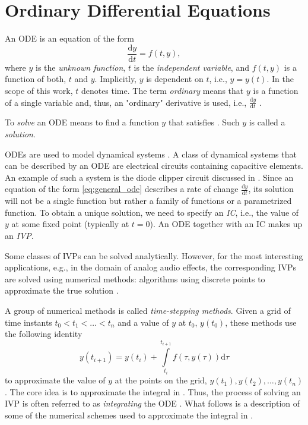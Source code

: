 \section{Ordinary Differential Equations}
\label{section:ode}

An \acf{ODE} is an equation of the form
\begin{equation}
  \frac{\mathrm{d} y}{\mathrm{d} t} = f(t, y),
  \label{eq:general_ode}
\end{equation}
where $y$ is the \emph{unknown function}, $t$ is the \emph{independent variable}, and $f(t, y)$ is a function of both, $t$ and $y$. Implicitly, $y$ is dependent on $t$, i.e., $y = y(t)$. In the scope of this work, $t$ denotes time. The term \emph{ordinary} means that $y$ is a function of a single variable and, thus, an "ordinary" derivative is used, i.e., $\frac{\mathrm{d} y}{\mathrm{d} t}$ \cite{Gockenbach2011}.

To \emph{solve} an \ac{ODE} means to find a function $y$ that satisfies . Such $y$ is called a \emph{solution}.

\acp{ODE} are used to model dynamical systems \cite{Scheinerman1996,Karlsson2019}. A class of dynamical systems that can be described by an \ac{ODE} are electrical circuits containing capacitive elements. An example of such a system is the diode clipper circuit \cite{Yeh2007} discussed in .
Since an equation of the form \eqref{eq:general_ode} describes a rate of change $\frac{\mathrm{d} y}{\mathrm{d} t}$, its solution will not be a single function but rather a family of functions or a parametrized function. To obtain a unique solution, we need to specify an \emph{\ac{IC}}, i.e., the value of $y$ at some fixed point (typically at $t=0$). An \ac{ODE} together with an \acl{IC} makes up an \emph{\ac{IVP}}.

Some classes of \acp{IVP} can be solved analytically. However, for the most interesting applications, e.g., in the domain of analog audio effects, the corresponding \acp{IVP} are solved using numerical methods: algorithms using discrete points to approximate the true solution \cite{Gockenbach2011}. 

A group of numerical methods is called \emph{time-stepping methods}. Given a grid of time instants $t_0 < t_1 < \dots < t_n$ and a value of $y$ at $t_0$, $y(t_0)$, these methods use the following identity
\begin{equation}
  y(t_{i+1}) = y(t_{i}) + \int \limits_{t_i}^{t_{i+1}} f(\tau, y(\tau)) \mathrm{d} \tau
  \label{eq:time_stepping_identity}
\end{equation}
to approximate the value of $y$ at the points on the grid, $y(t_1), y(t_2), \dots, y(t_n)$. The core idea is to approximate the integral in . Thus, the process of solving an \ac{IVP} is often referred to as \emph{integrating} the \ac{ODE} \cite{Gockenbach2011}. What follows is a description of some of the numerical schemes used to approximate the integral in .

